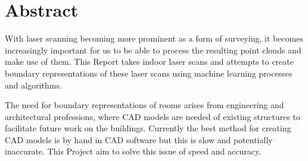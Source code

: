 \chapter*{Abstract}


	With laser scanning becoming more prominent as a form of surveying, it becomes increasingly important for us to be able to process the resulting point clouds and make use of them. This Report takes indoor laser scans and attempts to create boundary representations of these laser scans using machine learning processes and algorithms.
	
	The need for boundary representations of rooms arises from engineering and architectural professions, where CAD models are needed of existing structures to facilitate future work on the buildings. Currently the best method for creating CAD models is by hand in CAD software but this is slow and potentially inaccurate. This Project aim to solve this issue of speed and accuracy.